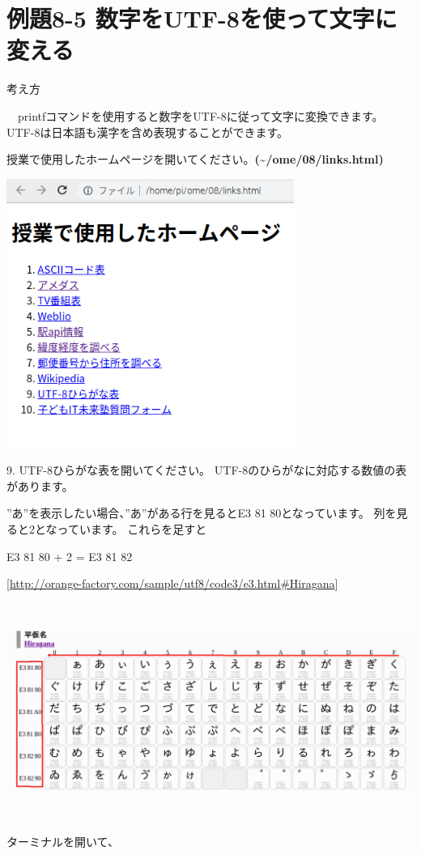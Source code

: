 \documentclass[a4paper,12pt,dvipdfmx]{jarticle}
\begin{document}
\clearpage\section{例題8-5
数字をUTF-8を使って文字に変える}
考え方

\ \ printfコマンドを使用すると数字をUTF-8に従って文字に変換できます。
UTF-8は日本語も漢字を含め表現することができます。

授業で使用したホームページを開いてください。\textbf{(\~{}/ome/08/links.html)}



\begin{center}
\includegraphics[width=9.398cm,height=8.784cm]{textbook-img017.png}

\end{center}


\bigskip


\bigskip

9.
UTF-8ひらがな表を開いてください。
UTF-8のひらがなに対応する数値の表があります。

”あ”を表示したい場合、”あ”がある行を見るとE3
81
80となっています。
列を見ると2となっています。
これらを足すと

E3 81 80 + 2 = E3 81 82

[\url{http://orange-factory.com/sample/utf8/code3/e3.html#Hiragana}]

\begin{center}
\includegraphics[width=17.006cm,height=7.049cm]{textbook-img018.png}

\end{center}
ターミナルを開いて、
\end{document}
